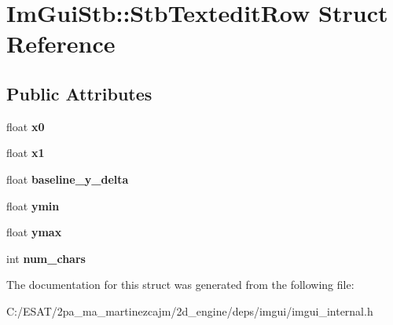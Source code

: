 \hypertarget{struct_im_gui_stb_1_1_stb_textedit_row}{}\section{Im\+Gui\+Stb\+:\+:Stb\+Textedit\+Row Struct Reference}
\label{struct_im_gui_stb_1_1_stb_textedit_row}
\subsection*{Public Attributes}
\begin{DoxyCompactItemize}
\item 
\mbox{\label{struct_im_gui_stb_1_1_stb_textedit_row_a54de789c8fab0c5ad31582205b5ffc8a}} 
float {\bfseries x0}
\item 
\mbox{\label{struct_im_gui_stb_1_1_stb_textedit_row_a53dcf8609e65440d8f16c6e531c21bc3}} 
float {\bfseries x1}
\item 
\mbox{\label{struct_im_gui_stb_1_1_stb_textedit_row_a0a5d9561ecf2294b3341935f85b476a5}} 
float {\bfseries baseline\+\_\+y\+\_\+delta}
\item 
\mbox{\label{struct_im_gui_stb_1_1_stb_textedit_row_a0c8be0676857e3a182ab73d1782e5da0}} 
float {\bfseries ymin}
\item 
\mbox{\label{struct_im_gui_stb_1_1_stb_textedit_row_a24b4b9e6983914519d01335b4014a774}} 
float {\bfseries ymax}
\item 
\mbox{\label{struct_im_gui_stb_1_1_stb_textedit_row_a7c8074c51d638753e44cb808fd5698ae}} 
int {\bfseries num\+\_\+chars}
\end{DoxyCompactItemize}


The documentation for this struct was generated from the following file\+:\begin{DoxyCompactItemize}
\item 
C\+:/\+E\+S\+A\+T/2pa\+\_\+ma\+\_\+martinezcajm/2d\+\_\+engine/deps/imgui/imgui\+\_\+internal.\+h\end{DoxyCompactItemize}

